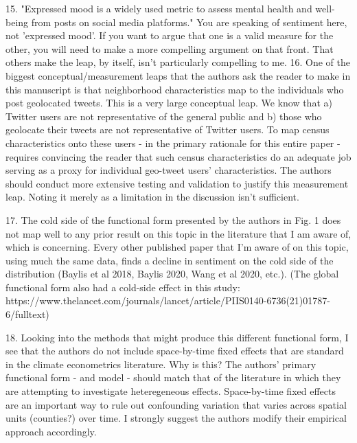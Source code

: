 15. "Expressed mood is a widely used metric to assess mental health and well-being from posts on social media platforms." You are speaking of sentiment here, not 'expressed mood'. If you want to argue that one is a valid measure for the other, you will need to make a more compelling argument on that front. That others make the leap, by itself, isn't particularly compelling to me.
16. One of the biggest conceptual/measurement leaps that the authors ask the reader to make in this manuscript is that neighborhood characteristics map to the individuals who post geolocated tweets. This is a very large conceptual leap. We know that a) Twitter users are not representative of the general public and b) those who geolocate their tweets are not representative of Twitter users. To map census characteristics onto these users - in the primary rationale for this entire paper - requires convincing the reader that such census characteristics do an adequate job serving as a proxy for individual geo-tweet users' characteristics. The authors should conduct more extensive testing and validation to justify this measurement leap. Noting it merely as a limitation in the discussion isn't sufficient.

17. The cold side of the functional form presented by the authors in Fig. 1 does not map well to any prior result on this topic in the literature that I am aware of, which is concerning. Every other published paper that I'm aware of on this topic, using much the same data, finds a decline in sentiment on the cold side of the distribution (Baylis et al 2018, Baylis 2020, Wang et al 2020, etc.). (The global functional form also had a cold-side effect in this study: https://www.thelancet.com/journals/lancet/article/PIIS0140-6736(21)01787-6/fulltext)

18. Looking into the methods that might produce this different functional form, I see that the authors do not include space-by-time fixed effects that are standard in the climate econometrics literature. Why is this? The authors' primary functional form - and model - should match that of the literature in which they are attempting to investigate heteregeneous effects. Space-by-time fixed effects are an important way to rule out confounding variation that varies across spatial units (counties?) over time. I strongly suggest the authors modify their empirical approach accordingly.

